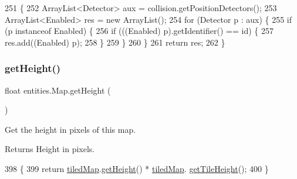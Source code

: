 \begin{DoxyCode}
251                                                                                        \{
252         ArrayList<Detector> aux = collision.getPositionDetectors();
253         ArrayList<Enabled> res = \textcolor{keyword}{new} ArrayList();
254         \textcolor{keywordflow}{for} (Detector p : aux) \{
255             \textcolor{keywordflow}{if} (p instanceof Enabled) \{
256                 \textcolor{keywordflow}{if} (((Enabled) p).getIdentifier() == \textcolor{keywordtype}{id}) \{
257                     res.add((Enabled) p);
258                 \}
259             \}
260         \}
261         \textcolor{keywordflow}{return} res;
262     \}
\end{DoxyCode}
\mbox{\label{classentities_1_1_map_a9ed9d1f8683c86dfca33639e252aaded}} 
\subsubsection{\texorpdfstring{get\+Height()}{getHeight()}}
{\footnotesize\ttfamily float entities.\+Map.\+get\+Height (\begin{DoxyParamCaption}{ }\end{DoxyParamCaption})\hspace{0.3cm}{\ttfamily [inline]}}

Get the height in pixels of this map.

\begin{DoxyReturn}{Returns}
Height in pixels. 
\end{DoxyReturn}

\begin{DoxyCode}
398                              \{
399         \textcolor{keywordflow}{return} \mbox{\hyperlink{classentities_1_1_map_a94a743ccd80946422fcbdb5ba1cc966b}{tiledMap}}.\mbox{\hyperlink{classorg_1_1newdawn_1_1slick_1_1tiled_1_1_tiled_map_a6370cae21692dded6097e8f877b62cac}{getHeight}}() * \mbox{\hyperlink{classentities_1_1_map_a94a743ccd80946422fcbdb5ba1cc966b}{tiledMap}}.
      \mbox{\hyperlink{classorg_1_1newdawn_1_1slick_1_1tiled_1_1_tiled_map_a03d0f5ea72a93c1939e97deea19a1d3a}{getTileHeight}}();
400     \}
\end{DoxyCode}
\mbox{\label{classentities_1_1_map_ae174e8e21c6307ea9058905778480ec1}} 
